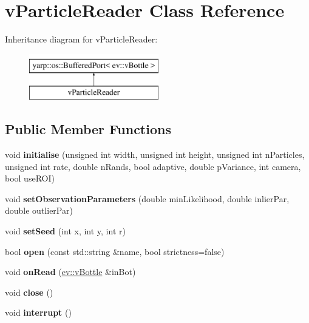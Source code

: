 \hypertarget{classvParticleReader}{}\section{v\+Particle\+Reader Class Reference}
\label{classvParticleReader}
Inheritance diagram for v\+Particle\+Reader\+:\begin{figure}[H]
\begin{center}
\leavevmode
\includegraphics[height=2.000000cm]{classvParticleReader}
\end{center}
\end{figure}
\subsection*{Public Member Functions}
\begin{DoxyCompactItemize}
\item 
void {\bfseries initialise} (unsigned int width, unsigned int height, unsigned int n\+Particles, unsigned int rate, double n\+Rands, bool adaptive, double p\+Variance, int camera, bool use\+R\+OI)\hypertarget{classvParticleReader_a423292f63faa86c5da923d7500166775}{}\label{classvParticleReader_a423292f63faa86c5da923d7500166775}

\item 
void {\bfseries set\+Observation\+Parameters} (double min\+Likelihood, double inlier\+Par, double outlier\+Par)\hypertarget{classvParticleReader_a07ef00d6c0f4f7b4f975e32d9a7cbbb6}{}\label{classvParticleReader_a07ef00d6c0f4f7b4f975e32d9a7cbbb6}

\item 
void {\bfseries set\+Seed} (int x, int y, int r)\hypertarget{classvParticleReader_a0025952cf4957b8eeedfff63e386ded4}{}\label{classvParticleReader_a0025952cf4957b8eeedfff63e386ded4}

\item 
bool {\bfseries open} (const std\+::string \&name, bool strictness=false)\hypertarget{classvParticleReader_a758adac809850f3fc1f01d2502d609bc}{}\label{classvParticleReader_a758adac809850f3fc1f01d2502d609bc}

\item 
void {\bfseries on\+Read} (\hyperlink{classev_1_1vBottle}{ev\+::v\+Bottle} \&in\+Bot)\hypertarget{classvParticleReader_af4bb9d631985a90d797416eca04777bb}{}\label{classvParticleReader_af4bb9d631985a90d797416eca04777bb}

\item 
void {\bfseries close} ()\hypertarget{classvParticleReader_a727d94974d16c502ac2518c5760e0fcc}{}\label{classvParticleReader_a727d94974d16c502ac2518c5760e0fcc}

\item 
void {\bfseries interrupt} ()\hypertarget{classvParticleReader_af7e95400429bb07bc9a438f8a163023e}{}\label{classvParticleReader_af7e95400429bb07bc9a438f8a163023e}

\end{DoxyCompactItemize}


